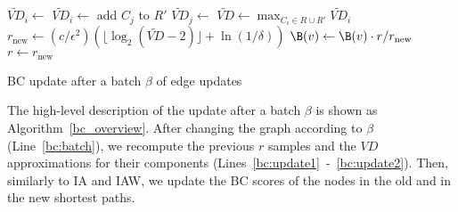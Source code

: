 \documentclass[english]{llncs}
\newcommand{\vd}{$\mathit{VD}$\xspace}
\newcommand{\ia}{\textsf{IA}\xspace}
\newcommand{\iaw}{\textsf{IAW}\xspace}
\newcommand{\vda}{$\tilde{\mathit{VD}}$\xspace}
\begin{document}
\begin{algorithm}[h]
\begin{small}
\LinesNumbered
{}
\; \label{bc:batch}
{\label{bc:update1}
	$\tilde{\mathit{VD}}_i \leftarrow$ \;\label{bc:dynsssp}
 
}\label{bc:update2}
{\label{bc:rprime1}
	$\tilde{\mathit{VD}}_i \leftarrow$ \;
}\label{bc:rprime2}
{\label{bc:unvisited1}
	add $C_j$ to $R'$\;
	$\tilde{\mathit{VD}}_j \leftarrow$ \;
}\label{bc:unvisited2}
\vda $\leftarrow \max_{C_i \in R \cup R'} \tilde{\mathit{VD}}_i$\; \label{bc:recompute1}
$r_{\text{new}} \leftarrow (c/\epsilon^2) (\lfloor \log_2(\tilde{\mathit{VD}}-2)\rfloor +\ln(1/\delta))$\; \label{bc:recompute2}
{\label{bc:norm1}
	\sampleNewPaths{} 
	{
		$\B(v) \leftarrow \B(v) \cdot r/r_{\text{new}}$ \label{bc:norm1} 
	}
$r \leftarrow r_{\text{new}}$\;
}\label{bc:norm2}
\end{small}
\caption{BC update after a batch $\beta$ of edge updates}
\label{bc_overview}
\end{algorithm}
The high-level description of the update after a batch $\beta$ is shown as Algorithm~\ref{bc_overview}. 
After changing the graph according to $\beta$ (Line~\ref{bc:batch}), we recompute the previous $r$ samples and the \vd approximations for their components (Lines~\ref{bc:update1}~-~\ref{bc:update2}). Then, similarly to \ia and \iaw, we update the BC scores of the nodes in the old and in the new shortest paths. 
\end{document}
